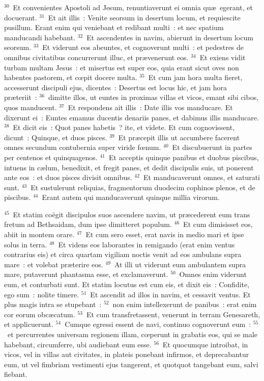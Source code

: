 ${}^{30}$~Et convenientes Apostoli ad Jesum, renuntiaverunt ei omnia qu\ae\ egerant, et docuerant.
${}^{31}$~Et ait illis~: Venite seorsum in desertum locum, et requiescite pusillum. Erant enim qui veniebant et redibant multi~: et nec spatium manducandi habebant.
${}^{32}$~Et ascendentes in navim, abierunt in desertum locum seorsum.
${}^{33}$~Et viderunt eos abeuntes, et cognoverunt multi~: et pedestres de omnibus civitatibus concurrerunt illuc, et pr\ae venerunt eos.
${}^{34}$~Et exiens vidit turbam multam Jesus~: et misertus est super eos, quia erant sicut oves non habentes pastorem, et cœpit docere multa.
${}^{35}$~Et cum jam hora multa fieret, accesserunt discipuli ejus, dicentes~: Desertus est locus hic, et jam hora pr\ae teriit~:
${}^{36}$~dimitte illos, ut euntes in proximas villas et vicos, emant sibi cibos, quos manducent.
${}^{37}$~Et respondens ait illis~: Date illis vos manducare. Et dixerunt ei~: Euntes emamus ducentis denariis panes, et dabimus illis manducare.
${}^{38}$~Et dicit eis~: Quot panes habetis~? ite, et videte. Et cum cognovissent, dicunt~: Quinque, et duos pisces.
${}^{39}$~Et pr\ae cepit illis ut accumbere facerent omnes secundum contubernia super viride fœnum.
${}^{40}$~Et discubuerunt in partes per centenos et quinquagenos.
${}^{41}$~Et acceptis quinque panibus et duobus piscibus, intuens in c\ae lum, benedixit, et fregit panes, et dedit discipulis suis, ut ponerent ante eos~: et duos pisces divisit omnibus.
${}^{42}$~Et manducaverunt omnes, et saturati sunt.
${}^{43}$~Et sustulerunt reliquias, fragmentorum duodecim cophinos plenos, et de piscibus.
${}^{44}$~Erant autem qui manducaverunt quinque millia virorum.


${}^{45}$~Et statim co\"egit discipulos suos ascendere navim, ut pr\ae cederent eum trans fretum ad Bethsaidam, dum ipse dimitteret populum.
${}^{46}$~Et cum dimisisset eos, abiit in montem orare.
${}^{47}$~Et cum sero esset, erat navis in medio mari et ipse solus in terra.
${}^{48}$~Et videns eos laborantes in remigando (erat enim ventus contrarius eis) et circa quartam vigiliam noctis venit ad eos ambulans supra mare~: et volebat pr\ae terire eos.
${}^{49}$~At illi ut viderunt eum ambulantem supra mare, putaverunt phantasma esse, et exclamaverunt.
${}^{50}$~Omnes enim viderunt eum, et conturbati sunt. Et statim locutus est cum eis, et dixit eis~: Confidite, ego sum~: nolite timere.
${}^{51}$~Et ascendit ad illos in navim, et cessavit ventus. Et plus magis intra se stupebant~:
${}^{52}$~non enim intellexerunt de panibus~: erat enim cor eorum obc\ae catum.
${}^{53}$~Et cum transfretassent, venerunt in terram Genesareth, et applicuerunt.
${}^{54}$~Cumque egressi essent de navi, continuo cognoverunt eum~:
${}^{55}$~et percurrentes universam regionem illam, cœperunt in grabatis eos, qui se male habebant, circumferre, ubi audiebant eum esse.
${}^{56}$~Et quocumque introibat, in vicos, vel in villas aut civitates, in plateis ponebant infirmos, et deprecabantur eum, ut vel fimbriam vestimenti ejus tangerent, et quotquot tangebant eum, salvi fiebant.

